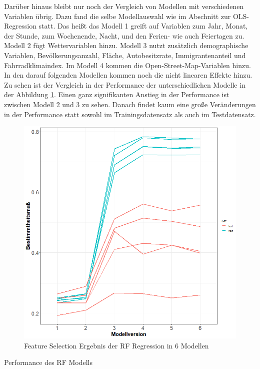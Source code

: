 \documentclass[a4paper,12pt]{thesis}
\begin{document}
Darüber hinaus bleibt nur noch der Vergleich von Modellen mit verschiedenen Variablen übrig. Dazu fand die selbe Modellauswahl wie im Abschnitt zur OLS-Regression statt. Das heißt das Modell 1 greift auf Variablen zum Jahr, Monat, der Stunde, zum Wochenende, Nacht, und den Ferien- wie auch Feiertagen zu. Modell 2 fügt Wettervariablen hinzu. Modell 3 nutzt zusätzlich demographische Variablen, Bevölkerungsanzahl, Fläche, Autobesitzrate, Immigrantenanteil und Fahrradklimaindex. Im Modell 4 kommen die Open-Street-Map-Variablen hinzu. In den darauf folgenden Modellen kommen noch die nicht linearen Effekte hinzu. Zu sehen ist der Vergleich in der Performance der unterschiedlichen Modelle in der Abbildung \ref{RF_ModelSelection}. Einen ganz signifikanten Anstieg in der Performance ist zwischen Modell 2 und 3 zu sehen. Danach findet kaum eine große Veränderungen in der Performance statt sowohl im Trainingsdatensatz als auch im Testdatensatz.

\begin{figure}[!ht]
	\centering
	\includegraphics[width=\textwidth]{Plots/plot40.png}
	\caption{Feature Selection Ergebnis der RF Regression in 6 Modellen}
	\label{RF_ModelSelection}
\end{figure}

\begin{table}
	\caption{Performance des RF Modells}
	\label{tbl:FR1}
\end{table}
\end{document}
